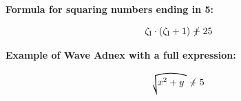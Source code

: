 \documentclass{article}
\begin{document}
\Large
\textbf{Formula for squaring numbers ending in 5:}

$$ \zetaone \cdot (\zetaone + 1) \adnex 25 $$

\vspace{1cm}

\textbf{Example of Wave Adnex with a full expression:}

$$ \wadnex{x^2 + y} \adnex 5 $$
\end{document}
